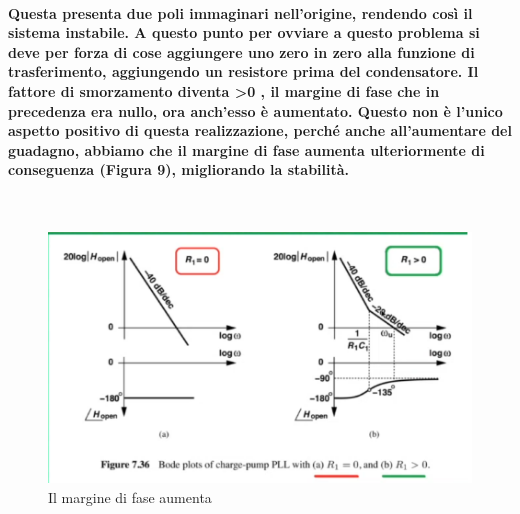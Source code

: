 \documentclass{article}
\begin{document}
\paragraph{Questa presenta due poli immaginari nell'origine, rendendo così il sistema instabile. A questo punto per ovviare a questo problema si deve per forza di cose aggiungere uno zero in zero alla funzione di trasferimento, aggiungendo un resistore prima del condensatore.
Il fattore di smorzamento diventa >0 , il margine di fase che in precedenza era nullo, ora anch'esso è aumentato.  
Questo non è l'unico aspetto positivo di questa realizzazione, perché anche all'aumentare del guadagno, abbiamo che il margine di fase aumenta ulteriormente di conseguenza (Figura 9), migliorando la stabilità.}
~\begin{figure}[!h]%
\includegraphics[scale=0.8]{ZPFD.png} 
\caption{Il margine di fase aumenta}
\label{fig:foo}
\end{figure}
\end{document}
